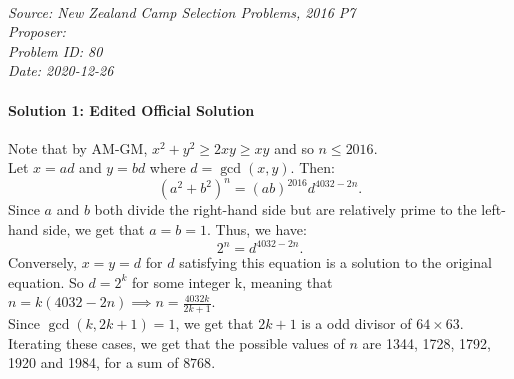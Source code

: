 \SSbreak\\
\emph{Source: New Zealand Camp Selection Problems, 2016 P7}\\
\emph{Proposer: \Pbrain}\\
\emph{Problem ID: 80}\\
\emph{Date: 2020-12-26}\\
\SSbreak

\bigskip

\begin{solution}\hfil\medskip
	
\paragraph{Solution 1: Edited Official Solution}
Note that by AM-GM, \(x^2 + y^2 \ge 2xy \ge xy\) and so \(n \le 2016\). \\
Let \(x = ad\) and \(y = bd\) where \(d =\gcd(x, y)\). Then: \[(a^2 + b^2)^n = (ab)^{2016} d^{4032-2n}.\]
Since \(a\) and \(b\) both divide the right-hand side but are relatively prime to the left-hand side, we get that \(a = b = 1\). Thus, we have: \[2^n = d^{4032-2n}.\]
Conversely, \(x = y = d\) for \(d\) satisfying this equation is a solution to the original equation. So \(d = 2^k\) for some integer k, meaning that \(n = k(4032-2n) \implies n = \frac{4032k}{2k+1}\). \\
Since \(\gcd(k, 2k+1) = 1\), we get that \(2k + 1\) is a odd divisor of \(64 \times 63\). Iterating these cases, we get that the possible values of \(n\) are 1344, 1728, 1792, 1920 and 1984, for a sum of \( \boxed{8768}\). 

\end{solution}\bigskip
